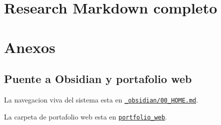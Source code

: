 \documentclass[10pt,openany]{book}
\begin{document}
\appendix
\part{Research Markdown completo}



















\part{Anexos}



\chapter*{Puente a Obsidian y portafolio web}
La navegacion viva del sistema esta en \href{file:///E:/Laboral/_obsidian/00_HOME.md}{\texttt{\_obsidian/00\_HOME.md}}.

La carpeta de portafolio web esta en \href{file:///E:/Laboral/portfolio_web}{\texttt{portfolio\_web}}.
\end{document}
